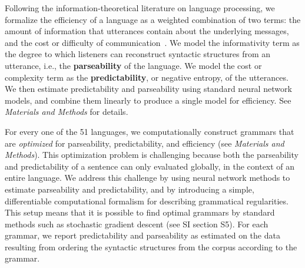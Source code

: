 \documentclass[9pt,twocolumn,twoside,lineno]{pnas-new}
\newcommand{\key}[1]{\textbf{#1}}
\begin{document}
Following the information-theoretical literature on language processing, 
we formalize the  efficiency of a language as a weighted combination of two terms:  the 
amount of information that utterances contain about the underlying messages, and the  cost or difficulty of communication~\cite{ferreri2003least,frank2012predicting,zaslavsky2018efficient,kemp2012kinship,regier2015word,goodman2013knowledge}.
We model the informativity term as the 
 degree to which listeners can reconstruct syntactic structures from an utterance, i.e., the \key{parseability} of the language. We model the cost or complexity term as the 
 \key{predictability}, or negative entropy, of the utterances. %
 We then estimate predictability and parseability using standard neural network models, and combine them linearly to produce a single model for efficiency.
 See \textit{Materials and Methods} for details.

For every one of the 51 languages, we computationally construct grammars that are \emph{optimized} for parseability, predictability, and efficiency (see \textit{Materials and Methods}).
This optimization problem is challenging because both the parseability and predictability of a sentence can only evaluated globally, in the context of an entire language.
We address this challenge by using neural network methods to estimate parseability and predictability, and by introducing a simple, differentiable computational formalism for describing grammatical regularities. 
This setup means that it is possible to find optimal grammars by standard methods such as stochastic gradient descent (see SI section S5).
For each grammar, we report predictability and parseability as estimated on the data resulting from ordering the syntactic structures from the corpus according to the grammar.
\end{document}

